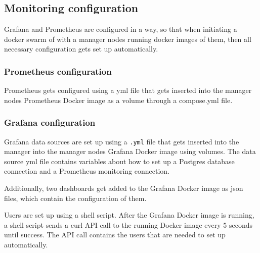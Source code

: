 \subsection{Monitoring configuration}

Grafana and Prometheus are configured in a way, so that when initiating a docker swarm of with a manager nodes running docker images of them, then all necessary configuration gets set up automatically.

\subsubsection{Prometheus configuration}

Prometheus gets configured using a yml file that gets inserted into the manager nodes Prometheus Docker image as a volume through a compose.yml file.

\subsubsection{Grafana configuration}

Grafana data sources are set up using a \texttt{.yml} file that gets inserted into the manager into the manager nodes Grafana Docker image using volumes.
The data source yml file contains variables about how to set up a Postgres database connection and a Prometheus monitoring connection.

Additionally, two dashboards get added to the Grafana Docker image as json files, which contain the configuration of them.

Users are set up using a shell script.
After the Grafana Docker image is running, a shell script sends a curl API call to the running Docker image every 5 seconds until success.
The API call contains the users that are needed to set up automatically.
